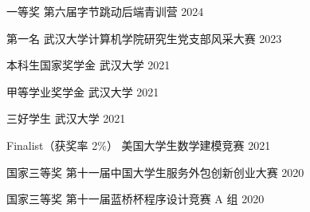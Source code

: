 

\begin{cvhonors}

  \cvhonor
    {一等奖} %
    {第六届字节跳动后端青训营} %
    {} %
    {2024} %

  \cvhonor
    {第一名}
    {武汉大学计算机学院研究生党支部风采大赛}
    {}
    {2023}

  \cvhonor
    {本科生国家奖学金}
    {武汉大学}
    {}
    {2021}

  \cvhonor
    {甲等学业奖学金}
    {武汉大学}
    {}
    {2021}

  \cvhonor
    {三好学生}
    {武汉大学}
    {}
    {2021}

  \cvhonor
    {Finalist（获奖率 2\%）}
    {美国大学生数学建模竞赛}
    {}
    {2021}
  
  \cvhonor
    {国家三等奖}
    {第十一届中国大学生服务外包创新创业大赛}
    {}
    {2020}

  \cvhonor
    {国家三等奖}
    {第十一届蓝桥杯程序设计竞赛 A 组}
    {}
    {2020}

\end{cvhonors}
